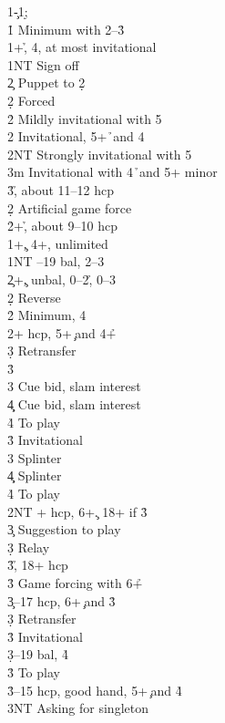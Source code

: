 \documentclass[a4paper]{article}
\begin{document}
\begin{bidtable}
1\c-1\d;\\
1\h \> Minimum with 2--3\h \+\\
1\s {}+\h , 4\s , at most invitational\\
1NT \> Sign off\\
2\c \> Puppet to 2\d \+\\
2\d \> Forced\+\\
2\h \> Mildly invitational with 5\h \\
2\s \> Invitational, 5+\h\ and 4\s \\
2NT \> Strongly invitational with 5\h \\
3m \> Invitational with 4\h\ and 5+ minor\\
3\h {}\h , about 11--12 hcp\-\-\\
2\d \> Artificial game force\\
2\h {}+\h , about 9--10 hcp\-\\
1\s {}+\c , 4+\s , unlimited\\
1NT --19 bal, 2--3\h \\
2\c {}+\c , unbal, 0--2\h , 0--3\s \\
2\d \> Reverse\\
2\h \> Minimum, 4\h \\
2\s {}+ hcp, 5+\c\ and 4+\h \+\\
3\d \> Retransfer\+\\
3\h\+\\
3\s \> Cue bid, slam interest\\
4\c\d \> Cue bid, slam interest\\
4\h \> To play\-\-\\
3\h \> Invitational\\
3\s \> Splinter\\
4\c\d \> Splinter\\
4\h \> To play\-\\
2NT + hcp, 6+\c . 18+ if 3\h \+\\
3\c \> Suggestion to play\\
3\d \> Relay\+\\
3\h {}\h , 18+ hcp\-\\
3\h \> Game forcing with 6+\h \-\\
3\c {}--17 hcp, 6+\c\ and 3\h \+\\
3\d \> Retransfer\\
3\h \> Invitational\-\\
3\d {}--19 bal, 4\h \+\\
3\h \> To play\-\\
3\h {}--15 hcp, good hand, 5+\c\ and 4\h \+\\
3NT \> Asking for singleton\-
\end{bidtable}
\end{document}
